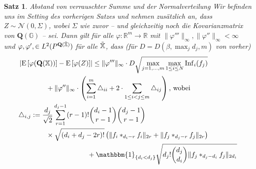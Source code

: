\documentclass[11pt, ngerman]{scrartcl}
\theoremstyle{definition}
\theoremstyle{plain}
\newtheorem{satz}[definition]{Satz}
\newcommand{\R}[0]{\mathbb{R}}
\newcommand{\X}[0]{\mathbb{X}}
\newcommand{\indicatorset}[1]{\mathbbm{1}_{\{#1\}}}
\newcommand{\E}[1][]{%
    \operatorname{E}%
    \ifx\\#1\\\else%
        \left[#1\right]%
    \fi%
}
\newcommand{\<}{\langle}
\renewcommand{\>}{\rangle}
\newcommand{\norm}[1]{\lVert#1\rVert}
\begin{document}
 \begin{satz}{Abstand von verrauschter Summe und der Normalverteilung}
        Wir befinden uns im Setting des vorherigen Satzes und nehmen zusätzlich an, dass $Z \sim \mathcal{N}(0, \Sigma)$, wobei $\Sigma$ wie zuvor -- und gleichzeitig noch die Kovarianzmatrix von $\mathbf{Q}(\mathbb{G})$ -- sei.
        Dann gilt für alle $\varphi: \R^m \to \R$ mit $\norm{\varphi'''}_\infty, \norm{\varphi''}_\infty < \infty$ und $\varphi, \varphi', \in L^2(P^{\mathbf{Q}(\Tilde{\mathbb{X}})})$ für alle $\Tilde{\mathbb{X}}$, dass  (für $D = D(\beta, \max_j d_j, m)$ von vorher)
        \vspace{-0.4cm}
        \begin{align*}
            &\left|\E[\varphi(\mathbf{Q}(\X))] - \E[\varphi(Z)]\right| \leq \norm{\varphi'''}_\infty \cdot D \sqrt{\max_{j=1, \ldots, m}\max_{1 \leq i \leq N} \mathrm{Inf}_i(f_j)} \\ &\qquad \qquad + \norm{\varphi''}_\infty \cdot \left(\sum_{i=1}^m \triangle_{ii} + 2 \cdot \sum_{1\leq i < j \leq m} \triangle_{ij}\right)\text{, wobei } \\
       & \triangle_{i,j} := \frac{d_j}{\sqrt{2}} \sum_{r = 1}^{d_j -1} (r-1)! \binom{d_i-1}{r-1} \binom{d_j-1}{r-1} \\ & \qquad \qquad \times  \sqrt{(d_i + d_j - 2r)!} \left(\norm{f_i *_{d_i -r } f_i}_{2r} + \norm{f_j *_{d_j - r}f_j}_{2r}\right) \\ & \qquad \qquad \qquad \qquad \qquad + \indicatorset{d_i < d_j} \sqrt{d_j! \binom{d_j}{d_i} \norm{f_j *_{d_j - d_i} f_j}_{2d_i}} \end{align*}
    \end{satz}
\end{document}
